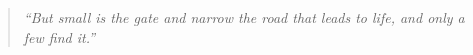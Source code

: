 \phantom{.}
\vspace{4in}

\begin{singlespace}
\begin{quote}
  \textit{``But small is the gate and narrow the road that leads to life, and only a few find it.''}\\
  \hfill{}
\end{quote}
\end{singlespace}

%
